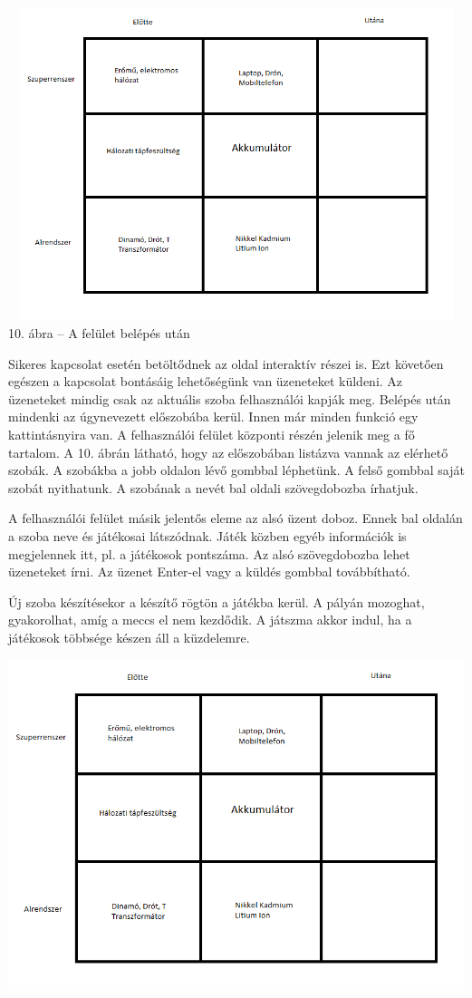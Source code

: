 \documentclass[]{article}
\begin{document}
\includegraphics[width=5.90551in,height=3.59853in]{media/image7.png}10.
ábra -- A felület belépés után

Sikeres kapcsolat esetén betöltődnek az oldal interaktív részei is. Ezt
követően egészen a kapcsolat bontásáig lehetőségünk van üzeneteket
küldeni. Az üzeneteket mindig csak az aktuális szoba felhasználói kapják
meg. Belépés után mindenki az úgynevezett előszobába kerül. Innen már
minden funkció egy kattintásnyira van. A felhasználói felület központi
részén jelenik meg a fő tartalom. A 10. ábrán látható, hogy az
előszobában listázva vannak az elérhető szobák. A szobákba a jobb
oldalon lévő gombbal léphetünk. A felső gombbal saját szobát nyithatunk.
A szobának a nevét bal oldali szövegdobozba írhatjuk.

A felhasználói felület másik jelentős eleme az alsó üzent doboz. Ennek
bal oldalán a szoba neve és játékosai látszódnak. Játék közben egyéb
információk is megjelennek itt, pl. a játékosok pontszáma. Az alsó
szövegdobozba lehet üzeneteket írni. Az üzenet Enter-el vagy a küldés
gombbal továbbítható.

Új szoba készítésekor a készítő rögtön a játékba kerül. A pályán
mozoghat, gyakorolhat, amíg a meccs el nem kezdődik. A játszma akkor
indul, ha a játékosok többsége készen áll a küzdelemre.

\includegraphics[width=5.90556in,height=3.82737in]{media/image8.png}
\end{document}
